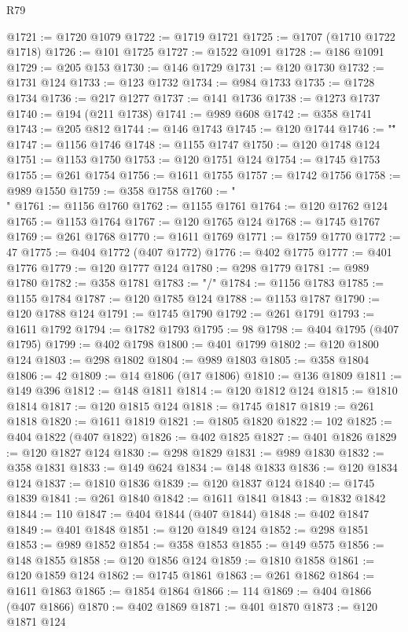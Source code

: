 \begin{lexlean}{R79}
\begin{coremodule}
@1721 := @1720 @1079
@1722 := @1719 @1721
@1725 := @1707 (@1710 @1722 @1718)
@1726 := @101 @1725
@1727 := @1522 @1091
@1728 := @186 @1091
@1729 := @205 @153
@1730 := @146 @1729
@1731 := @120 @1730
@1732 := @1731 @124
@1733 := @123 @1732
@1734 := @984 @1733
@1735 := @1728 @1734
@1736 := @217 @1277
@1737 := @141 @1736
@1738 := @1273 @1737
@1740 := @194 (@211 @1738)
@1741 := @989 @608
@1742 := @358 @1741
@1743 := @205 @812
@1744 := @146 @1743
@1745 := @120 @1744
@1746 := "\""
@1747 := @1156 @1746
@1748 := @1155 @1747
@1750 := @120 @1748 @124
@1751 := @1153 @1750
@1753 := @120 @1751 @124
@1754 := @1745 @1753
@1755 := @261 @1754
@1756 := @1611 @1755
@1757 := @1742 @1756
@1758 := @989 @1550
@1759 := @358 @1758
@1760 := "\\"
@1761 := @1156 @1760
@1762 := @1155 @1761
@1764 := @120 @1762 @124
@1765 := @1153 @1764
@1767 := @120 @1765 @124
@1768 := @1745 @1767
@1769 := @261 @1768
@1770 := @1611 @1769
@1771 := @1759 @1770
@1772 := 47
@1775 := @404 @1772 (@407 @1772)
@1776 := @402 @1775
@1777 := @401 @1776
@1779 := @120 @1777 @124
@1780 := @298 @1779
@1781 := @989 @1780
@1782 := @358 @1781
@1783 := "/"
@1784 := @1156 @1783
@1785 := @1155 @1784
@1787 := @120 @1785 @124
@1788 := @1153 @1787
@1790 := @120 @1788 @124
@1791 := @1745 @1790
@1792 := @261 @1791
@1793 := @1611 @1792
@1794 := @1782 @1793
@1795 := 98
@1798 := @404 @1795 (@407 @1795)
@1799 := @402 @1798
@1800 := @401 @1799
@1802 := @120 @1800 @124
@1803 := @298 @1802
@1804 := @989 @1803
@1805 := @358 @1804
@1806 := 42
@1809 := @14 @1806 (@17 @1806)
@1810 := @136 @1809
@1811 := @149 @396
@1812 := @148 @1811
@1814 := @120 @1812 @124
@1815 := @1810 @1814
@1817 := @120 @1815 @124
@1818 := @1745 @1817
@1819 := @261 @1818
@1820 := @1611 @1819
@1821 := @1805 @1820
@1822 := 102
@1825 := @404 @1822 (@407 @1822)
@1826 := @402 @1825
@1827 := @401 @1826
@1829 := @120 @1827 @124
@1830 := @298 @1829
@1831 := @989 @1830
@1832 := @358 @1831
@1833 := @149 @624
@1834 := @148 @1833
@1836 := @120 @1834 @124
@1837 := @1810 @1836
@1839 := @120 @1837 @124
@1840 := @1745 @1839
@1841 := @261 @1840
@1842 := @1611 @1841
@1843 := @1832 @1842
@1844 := 110
@1847 := @404 @1844 (@407 @1844)
@1848 := @402 @1847
@1849 := @401 @1848
@1851 := @120 @1849 @124
@1852 := @298 @1851
@1853 := @989 @1852
@1854 := @358 @1853
@1855 := @149 @575
@1856 := @148 @1855
@1858 := @120 @1856 @124
@1859 := @1810 @1858
@1861 := @120 @1859 @124
@1862 := @1745 @1861
@1863 := @261 @1862
@1864 := @1611 @1863
@1865 := @1854 @1864
@1866 := 114
@1869 := @404 @1866 (@407 @1866)
@1870 := @402 @1869
@1871 := @401 @1870
@1873 := @120 @1871 @124

\end{coremodule}
\end{lexlean}
